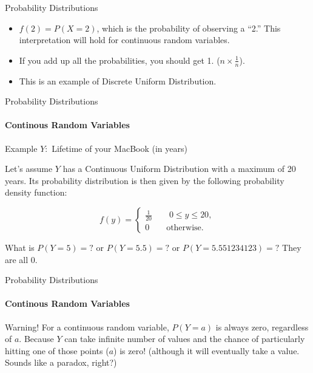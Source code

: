 \documentclass{beamer}\usepackage[]{graphicx}\usepackage[]{color}
\begin{document}
\begin{darkframes}
\begin{frame}[label=lists]{Probability Distributions}
       
        \begin{itemize}
        	\item $f(2)=P(X=2)$, which is the probability of observing a ``2.'' This interpretation will hold for continuous random variables.
        	
        	\item If you add up all the probabilities, you should get 1. ($n \times \frac{1}{n}$). 
    		
    		\item This is an example of \alert{Discrete Uniform Distribution}.    	
	        	
        \end{itemize} 
	\end{frame}







	\begin{frame}[label=lists]{Probability Distributions}
		\framesubtitle{Continous Random Variables} 
	
		\begin{exampleblock}{Example}
		$Y:$ Lifetime of your MacBook (in years) \newline
		
		Let's assume $Y$ has a \alert{Continuous Uniform Distribution} with a maximum of 20 years. Its probability distribution is then given by the following probability density function: \newline
		
		$$ f(y) = 
			\begin{cases}
				\frac{1}{20} \qquad 0 \leq y \leq 20, \\
				0 \qquad   \text{otherwise.}
			\end{cases}
		$$
		
		What is $P(Y=5)=?$ or $P(Y=5.5)=?$ or $P(Y=5.551234123)=?$ \newline
		They are all 0.
		
		
		\end{exampleblock}
			
	\end{frame}





	\begin{frame}[label=lists]{Probability Distributions}
		\framesubtitle{Continous Random Variables} 
	
		\begin{alertblock}{Warning!}
        For a continuous random variable, $P(Y=a)$ is always zero, regardless of $a$. Because $Y$ can take infinite number of values and the chance of particularly hitting one of those points ($a$) is zero! (although it will eventually take a value. Sounds like a paradox, right?)
      \end{alertblock} 
       \quad \newline
      

\end{frame}
\end{darkframes}
\end{document}
